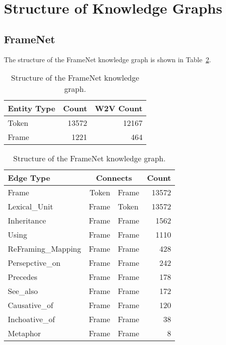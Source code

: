 \documentclass[11pt, a4paper]{article}
\begin{document}
\section{Structure of Knowledge Graphs}
\subsection{FrameNet}
\label{sec:framenet_structure}
The structure of the FrameNet \cite{baker1998berkeley,fillmore2003background} knowledge graph is shown in Table~\ref{tab:framenet_structure}.

\begin{table}[ht]
\centering
\begin{tabular}{l r r}
    \toprule
    \bf{Entity Type} & \bf{Count} & \bf{W2V Count} \\
    \midrule
    Token & 13572 & 12167 \\    
    Frame & 1221 & 464 \\
    \bottomrule
    \end{tabular}
    
    \vspace{8pt}
    
    \begin{tabular}{l r@{\ $\rightarrow$\ }l r }
        \toprule
        \bf{Edge Type} &\multicolumn{2}{c}{\bf{Connects}} & \bf{Count}\\
        \midrule
        Frame & Token & Frame & 13572 \\
        Lexical\_Unit & Frame & Token & 13572 \\
        Inheritance & Frame & Frame & 1562 \\
        Using & Frame & Frame & 1110 \\
        ReFraming\_Mapping & Frame & Frame & 428 \\
        Persepctive\_on & Frame & Frame & 242 \\
        Precedes & Frame & Frame & 178 \\
        See\_also & Frame & Frame & 172 \\
        Causative\_of & Frame & Frame & 120 \\
        Inchoative\_of & Frame & Frame & 38 \\
        Metaphor & Frame & Frame & 8 \\
        \bottomrule
    \end{tabular}
    \caption{Structure of the FrameNet knowledge graph.}
    \label{tab:framenet_structure}
\end{table}
\end{document}
